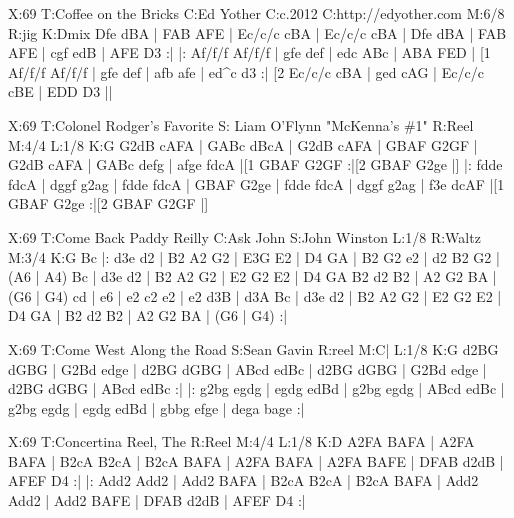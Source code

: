 \documentclass{article}
\begin{document}
\begin{abc}[name]
X:69
T:Coffee on the Bricks
C:Ed Yother
C:c.2012
C:http://edyother.com
M:6/8
R:jig
K:Dmix
Dfe dBA | FAB AFE | Ec/c/c cBA | Ec/c/c cBA |
Dfe dBA | FAB AFE | cgf edB | AFE D3 :|
|: Af/f/f Af/f/f | gfe def | edc ABc | ABA FED |
[1 Af/f/f Af/f/f | gfe def | afb afe | ed^c d3 :|
[2 Ec/c/c cBA | ged cAG | Ec/c/c cBE | EDD D3 ||
\end{abc}

\begin{abc}[name]
X:69
T:Colonel Rodger's Favorite
S: Liam O'Flynn "McKenna's \#1"
R:Reel
M:4/4
L:1/8
K:G
G2dB cAFA | GABc dBcA | G2dB cAFA | GBAF G2GF |
G2dB cAFA | GABc defg | afge fdcA |[1 GBAF G2GF :|[2 GBAF G2ge |]
|: fdde fdcA | dggf g2ag | fdde fdcA | GBAF G2ge |
fdde fdcA | dggf g2ag | f3e dcAF |[1 GBAF G2ge :|[2 GBAF G2GF |]
\end{abc}

\begin{abc}[name]
X:69
T:Come Back Paddy Reilly
C:Ask John
S:John Winston
L:1/8
R:Waltz
M:3/4
K:G
Bc |: d3e d2 | B2 A2 G2 | E3G E2 | D4 GA |
B2 G2 e2 | d2 B2 G2 | (A6 | A4) Bc |
d3e d2 | B2 A2 G2 | E2 G2 E2 | D4 GA
B2 d2 B2 | A2 G2 BA | (G6 | G4) cd |
e6 | e2 c2 e2 | e2 d3B | d3A Bc |
d3e d2 | B2 A2 G2 | E2 G2 E2 | D4 GA |
B2 d2 B2 | A2 G2 BA | (G6 | G4) :|
\end{abc}

\begin{abc}[name]
X:69
T:Come West Along the Road
S:Sean Gavin
R:reel
M:C|
L:1/8
K:G
d2BG dGBG | G2Bd edge | d2BG dGBG | ABcd edBc |
d2BG dGBG | G2Bd edge | d2BG dGBG | ABcd edBc :|
|: g2bg egdg | egdg edBd | g2bg egdg | ABcd edBc |
g2bg egdg | egdg edBd | gbbg efge | dega bage :|
\end{abc}

\begin{abc}[name]
X:69
T:Concertina Reel, The
R:Reel
M:4/4
L:1/8
K:D
A2FA BAFA | A2FA BAFA | B2cA B2cA | B2cA BAFA |
A2FA BAFA | A2FA BAFE | DFAB d2dB | AFEF D4 :|
|: Add2 Add2 | Add2 BAFA | B2cA B2cA | B2cA BAFA |
Add2 Add2 | Add2 BAFE | DFAB d2dB | AFEF D4 :|
\end{abc}
\end{document}
